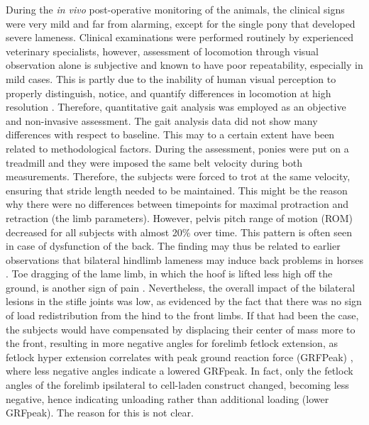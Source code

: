\documentclass[twocolumn, empirical, authordate, issue]{jote-new-article}
\begin{document}
During the \emph{in vivo} post-operative monitoring of the animals, the clinical signs were very mild and far from alarming, except for the single pony that developed severe lameness. Clinical examinations were performed routinely by experienced veterinary specialists, however, assessment of locomotion through visual observation alone is subjective and known to have poor repeatability, especially in mild cases. This is partly due to the inability of human visual perception to properly distinguish, notice, and quantify differences in locomotion at high resolution \parencite{SerraBraganca2018}. Therefore, quantitative gait analysis was employed as an objective and non-invasive assessment. The gait analysis data did not show many differences with respect to baseline. This may to a certain extent have been related to methodological factors. During the assessment, ponies were put on a treadmill and they were imposed the same belt velocity during both measurements. Therefore, the subjects were forced to trot at the same velocity, ensuring that stride length needed to be maintained. This might be the reason why there were no differences between timepoints for maximal protraction and retraction (the limb parameters). However, pelvis pitch range of motion (ROM) decreased for all subjects with almost 20\% over time. This pattern is often seen in case of dysfunction of the back. The finding may thus be related to earlier observations that bilateral hindlimb lameness may induce back problems in horses \parencite{Alvarez2008, Alvarez2007, Greve2017}. Toe dragging of the lame limb, in which the hoof is lifted less high off the ground, is another sign of pain \parencite{Buchner1995}. Nevertheless, the overall impact of the bilateral lesions in the stifle joints was low, as evidenced by the fact that there was no sign of load redistribution from the hind to the front limbs. If that had been the case, the subjects would have compensated by displacing their center of mass more to the front, resulting in more negative angles for forelimb fetlock extension, as fetlock hyper extension correlates with peak ground reaction force (GRFPeak) \parencite{Crevier-Denoix2010}, where less negative angles indicate a lowered GRFpeak. In fact, only the fetlock angles of the forelimb ipsilateral to cell-laden construct changed, becoming less negative, hence indicating unloading rather than additional loading (lower GRFpeak). The reason for this is not clear.
\end{document}
